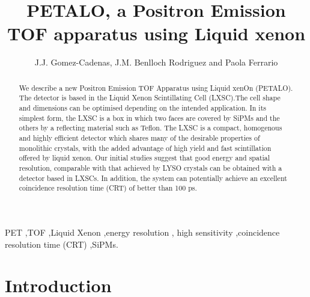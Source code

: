 \documentclass[review]{elsarticle}
\begin{document}
\begin{frontmatter}

\title{PETALO, a Positron Emission TOF apparatus using Liquid xenon}

\author{J.J. Gomez-Cadenas, J.M. Benlloch Rodriguez and Paola Ferrario}
\address{IFIC (U. Valencia/CSIC)}

%
%

\begin{abstract}
We describe a new Positron Emission TOF Apparatus using Liquid xenOn (PETALO). The detector is based in the Liquid Xenon Scintillating Cell (LXSC).The cell shape and dimensions  can be optimised depending on the intended application. In its simplest form, the LXSC is a box in which two faces are covered by SiPMs and the others by a reflecting material such as Teflon. The LXSC is a compact, homogenous and highly efficient detector which shares many of the desirable properties of monolithic crystals, with the added advantage of high yield and fast scintillation offered by liquid xenon. Our initial studies suggest that good energy and spatial resolution, comparable with that achieved by LYSO crystals can be obtained with a detector based in LXSCs. In addition, the system can potentially achieve an excellent coincidence resolution time (CRT) of better than 100 ps. 
\end{abstract}

\begin{keyword}
PET \sep TOF \sep Liquid Xenon \sep energy resolution \sep
 high sensitivity \sep coincidence resolution time (CRT) \sep SiPMs.
\end{keyword}

\end{frontmatter}

\linenumbers


\section{Introduction}
\end{document}
